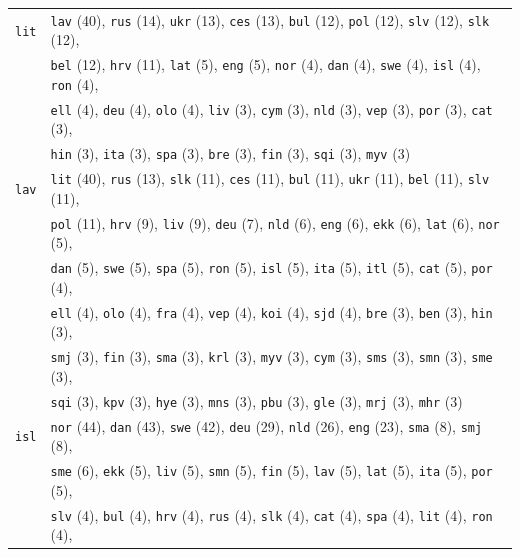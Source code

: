 \begin{center}
\begin{longtable}{ll}
\texttt{lit} & \texttt{lav} (40), \texttt{rus} (14), \texttt{ukr} (13), \texttt{ces} (13), \texttt{bul} (12), \texttt{pol} (12), \texttt{slv} (12), \texttt{slk} (12),\\
 & \texttt{bel} (12), \texttt{hrv} (11), \texttt{lat} (5), \texttt{eng} (5), \texttt{nor} (4), \texttt{dan} (4), \texttt{swe} (4), \texttt{isl} (4), \texttt{ron} (4),\\
 & \texttt{ell} (4), \texttt{deu} (4), \texttt{olo} (4), \texttt{liv} (3), \texttt{cym} (3), \texttt{nld} (3), \texttt{vep} (3), \texttt{por} (3), \texttt{cat} (3),\\
 & \texttt{hin} (3), \texttt{ita} (3), \texttt{spa} (3), \texttt{bre} (3), \texttt{fin} (3), \texttt{sqi} (3), \texttt{myv} (3) \\
\texttt{lav} & \texttt{lit} (40), \texttt{rus} (13), \texttt{slk} (11), \texttt{ces} (11), \texttt{bul} (11), \texttt{ukr} (11), \texttt{bel} (11), \texttt{slv} (11),\\
 & \texttt{pol} (11), \texttt{hrv} (9), \texttt{liv} (9), \texttt{deu} (7), \texttt{nld} (6), \texttt{eng} (6), \texttt{ekk} (6), \texttt{lat} (6), \texttt{nor} (5),\\
 & \texttt{dan} (5), \texttt{swe} (5), \texttt{spa} (5), \texttt{ron} (5), \texttt{isl} (5), \texttt{ita} (5), \texttt{itl} (5), \texttt{cat} (5), \texttt{por} (4),\\
 & \texttt{ell} (4), \texttt{olo} (4), \texttt{fra} (4), \texttt{vep} (4), \texttt{koi} (4), \texttt{sjd} (4), \texttt{bre} (3), \texttt{ben} (3), \texttt{hin} (3),\\
 & \texttt{smj} (3), \texttt{fin} (3), \texttt{sma} (3), \texttt{krl} (3), \texttt{myv} (3), \texttt{cym} (3), \texttt{sms} (3), \texttt{smn} (3), \texttt{sme} (3),\\
 & \texttt{sqi} (3), \texttt{kpv} (3), \texttt{hye} (3), \texttt{mns} (3), \texttt{pbu} (3), \texttt{gle} (3), \texttt{mrj} (3), \texttt{mhr} (3) \\
\texttt{isl} & \texttt{nor} (44), \texttt{dan} (43), \texttt{swe} (42), \texttt{deu} (29), \texttt{nld} (26), \texttt{eng} (23), \texttt{sma} (8), \texttt{smj} (8),\\
 & \texttt{sme} (6), \texttt{ekk} (5), \texttt{liv} (5), \texttt{smn} (5), \texttt{fin} (5), \texttt{lav} (5), \texttt{lat} (5), \texttt{ita} (5), \texttt{por} (5),\\
 & \texttt{slv} (4), \texttt{bul} (4), \texttt{hrv} (4), \texttt{rus} (4), \texttt{slk} (4), \texttt{cat} (4), \texttt{spa} (4), \texttt{lit} (4), \texttt{ron} (4),\\

\end{longtable}
\end{center}
